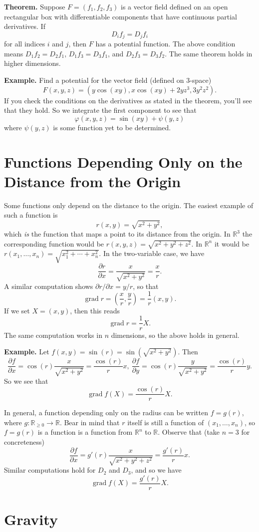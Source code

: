 \documentclass{article}
\DeclareMathOperator{\grd}{grad}
\begin{document}
\textbf{Theorem.}
Suppose $F = (f_1, f_2, f_3)$ is a vector field defined on an open rectangular box with differentiable components that have
continuous partial derivatives. If 
\[D_i f_j = D_j f_i\]
for all indices $i$ and $j$, then $F$ has a potential function.
The above condition means $D_1 f_2 = D_2 f_1$, $D_1 f_3 = D_3 f_1$, and $D_2 f_3 = D_3 f_2$.
The same theorem holds in higher dimensions.

\textbf{Example.} Find a potential for the vector field (defined on 3-space)
\[ F(x,y,z) = (y\cos(xy), x\cos(xy) + 2yz^3, 3y^2z^2).\]
If you check the conditions on the derivatives as stated in the theorem,
you'll see that they hold. So we integrate the first component to see that 
\[\varphi(x,y,z) = \sin(xy) + \psi(y,z)\]
where $\psi(y,z)$ is some function yet to be determined.

\section*{Functions Depending Only on the Distance from the Origin}

Some functions only depend on the distance to the origin. The easiest example of such a function is
\[r(x,y)=\sqrt{x^2+y^2},\]
which \emph{is} the function that maps a point to its distance from the origin. In $\mathbb{R}^3$ the corresponding
function would be $r(x,y,z) = \sqrt{x^2+y^2+z^2}$. In $\mathbb{R}^n$ it would be
$r(x_1,\ldots,x_n) = \sqrt{x_1^2 + \cdots + x_n^2}$. In the two-variable case, we have
\[  \frac{\partial r}{\partial x} = \frac{x}{\sqrt{x^2+y^2}} = \frac{x}{r}.\]
A similar computation shows $\partial r/\partial x = y/r$, so that 
\[ \grd r = \left( \frac{x}{r} , \frac{y}{r}\right) = \frac{1}{r} (x,y).\]
If we set $X = (x,y)$, then this reads
\[ \grd r = \frac{1}{r} X.\]
The same computation works in $n$ dimensions, so the above holds in general.

\textbf{Example.} Let $f(x,y) = \sin(r) = \sin(\sqrt{x^2+y^2})$. Then 
\[\frac{\partial f}{\partial x} = \cos(r) \frac{x}{\sqrt{x^2+y^2}}=\frac{\cos(r)}{r} x,\ \frac{\partial f}{\partial y} = \cos(r) \frac{y}{\sqrt{x^2+y^2}} = \frac{\cos(r)}{r}y.\]
So we see that
\[\grd f(X) = \frac{\cos(r)}{r} X.\]

In general, a function depending only on the radius can be written $f=g(r)$, where $g: \mathbb{R}_{\geq 0} \to \mathbb{R}$.
Bear in mind that $r$ itself is still a function of $(x_1, \ldots, x_n)$, so $f=g(r)$ is a function is a function
from $\mathbb{R}^n$ to $\mathbb{R}$. Observe that (take $n=3$ for concreteness)
\[ \frac{\partial f}{\partial x} = g'(r) \frac{x}{\sqrt{x^2+y^2+z^2}} = \frac{g'(r)}{r} x.\]
Similar computations hold for $D_2$ and $D_3$, and so we have
\[ \grd f(X) = \frac{g'(r)}{r} X.\]

\section*{Gravity}
\end{document}
